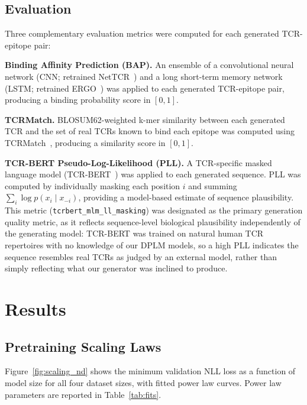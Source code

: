 \documentclass[12pt]{article}
\begin{document}
\subsection{Evaluation}

Three complementary evaluation metrics were computed for each generated TCR-epitope pair:

\textbf{Binding Affinity Prediction (BAP).} An ensemble of a convolutional neural network
(CNN; retrained NetTCR~\cite{montemurro2022}) and a long short-term memory network (LSTM;
retrained ERGO~\cite{springer2020}) was applied to each generated TCR-epitope pair, producing
a binding probability score in $[0, 1]$.

\textbf{TCRMatch.} BLOSUM62-weighted k-mer similarity between each generated TCR and the set
of real TCRs known to bind each epitope was computed using TCRMatch~\cite{chronister2021},
producing a similarity score in $[0, 1]$.

\textbf{TCR-BERT Pseudo-Log-Likelihood (PLL).} A TCR-specific masked language model
(TCR-BERT~\cite{wu2021tcrbert}) was applied to each generated sequence. PLL was computed
by individually masking each position $i$ and summing $\sum_{i} \log p(x_i \mid x_{-i})$,
providing a model-based estimate of sequence plausibility. This metric
(\texttt{tcrbert\_mlm\_ll\_masking}) was designated as the primary generation quality metric,
as it reflects sequence-level biological plausibility independently of the generating model:
TCR-BERT was trained on natural human TCR repertoires with no knowledge of our DPLM models,
so a high PLL indicates the sequence resembles real TCRs as judged by an external model,
rather than simply reflecting what our generator was inclined to produce.

\section{Results}

\subsection{Pretraining Scaling Laws}

Figure~\ref{fig:scaling_nd} shows the minimum validation NLL loss as a function of model size
for all four dataset sizes, with fitted power law curves. Power law parameters are reported in
Table~\ref{tab:fits}.
\end{document}
